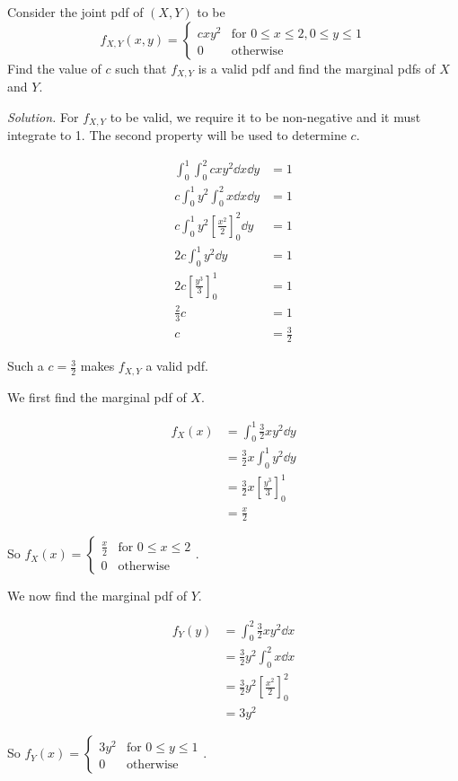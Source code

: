 \begin{example}[]\label{ex:jointpdf_cxy}
	Consider the joint pdf of $(X,Y)$ to be
	$$f_{X,Y}(x,y)=\begin{cases}
		cxy^2 & \text{for $0\leq x\leq 2,0\leq y\leq 1$}\\
		0 & \text{otherwise}
	\end{cases}$$
	Find the value of $c$ such that $f_{X,Y}$ is a valid pdf and find the marginal pdfs of $X$ and $Y$.

	\textit{Solution.} For $f_{X,Y}$ to be valid, we require it to be non-negative and it must integrate to 1. The second property will be used to determine $c$.

	\begin{align*}
		\int_0^1\int_0^2 cxy^2\dd x\dd y & =1\\
		c\int_0^1y^2\int_0^2 x\dd x\dd y & =1\\
		c\int_0^1y^2\left[\frac{x^2}{2}\right]_0^2\dd y & =1\\
		2c\int_0^1y^2\dd y & =1\\
		2c\left[\frac{y^3}{3}\right]_0^1 & =1\\
		\frac 23 c&=1\\
		c&=\frac 32
	\end{align*}

	Such a $c=\frac 32$ makes $f_{X,Y}$ a valid pdf.

	We first find the marginal pdf of $X$.

	\begin{align*}
		f_X(x)&=\int_0^1\frac 32xy^2\dd y\\
		&=\frac 32x\int_0^1y^2\dd y\\
		&=\frac 32x\left[\frac{y^3}{3}\right]_0^1\\
		&=\frac x2
	\end{align*}

	So $f_X(x)=\begin{cases}
		\frac x 2 & \text{for $0\leq x\leq 2$}\\
		0 & \text{otherwise}
	\end{cases}$.

	We now find the marginal pdf of $Y$.

	\begin{align*}
		f_Y(y)&=\int_0^2\frac 32xy^2\dd x\\
		&=\frac 32y^2\int_0^2x\dd x\\
		&=\frac 32y^2\left[\frac{x^2}{2}\right]_0^2\\
		&=3y^2
	\end{align*}

	So $f_Y(x)=\begin{cases}
		3y^2 & \text{for $0\leq y\leq 1$}\\
		0 & \text{otherwise}
	\end{cases}$.
\end{example}

